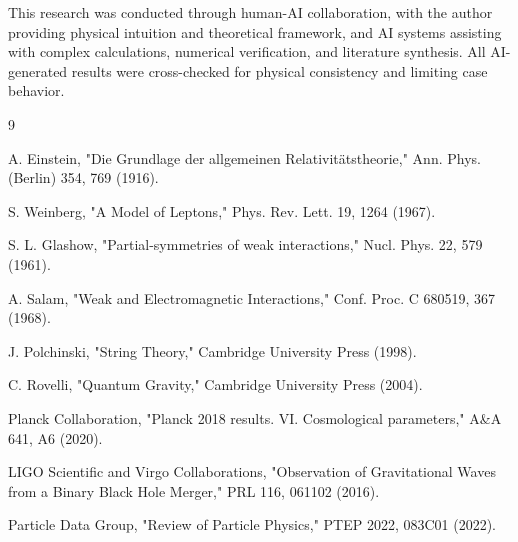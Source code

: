 \documentclass[aps,prd,reprint,superscriptaddress,amsmath,amssymb]{revtex4-2}
\begin{document}
\begin{acknowledgments}
This research was conducted through human-AI collaboration, with the author providing physical intuition and theoretical framework, and AI systems assisting with complex calculations, numerical verification, and literature synthesis. All AI-generated results were cross-checked for physical consistency and limiting case behavior.
\end{acknowledgments}

\begin{thebibliography}{9}

A. Einstein, "Die Grundlage der allgemeinen Relativitätstheorie," Ann. Phys. (Berlin) 354, 769 (1916).

S. Weinberg, "A Model of Leptons," Phys. Rev. Lett. 19, 1264 (1967).

S. L. Glashow, "Partial-symmetries of weak interactions," Nucl. Phys. 22, 579 (1961).

A. Salam, "Weak and Electromagnetic Interactions," Conf. Proc. C 680519, 367 (1968).

J. Polchinski, "String Theory," Cambridge University Press (1998).

C. Rovelli, "Quantum Gravity," Cambridge University Press (2004).

Planck Collaboration, "Planck 2018 results. VI. Cosmological parameters," A\&A 641, A6 (2020).

LIGO Scientific and Virgo Collaborations, "Observation of Gravitational Waves from a Binary Black Hole Merger," PRL 116, 061102 (2016).

Particle Data Group, "Review of Particle Physics," PTEP 2022, 083C01 (2022).

\end{thebibliography}
\end{document}
